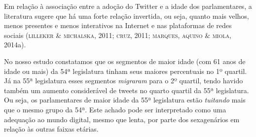 Em relação à associação entre a adoção do Twitter e a idade dos
parlamentares, a literatura sugere que há uma forte relação invertida,
ou seja, quanto mais velhos, menos presentes e menos interativos na
Internet e nas plataformas de redes sociais (\textsc{lilleker \& michalska},
2011; \textsc{cruz}, 2011; \textsc{marques, aquino \& miola}, 2014a).

No nosso estudo constatamos que os segmentos de maior idade (com 61 anos
de idade ou mais) da 54ª legislatura tinham seus maiores percentuais no
1º quartil. Já na 55ª legislatura esses segmentos \textit{migraram} para o 2º
quartil, tendo havido também um aumento considerável de tweets no quarto
quartil da 55ª legislatura. Ou seja, os parlamentares de maior idade da
55ª legislatura estão \emph{tuitando} mais que o mesmo grupo da 54ª.
Este achado pode ser interpretado como uma adequação ao mundo digital,
mesmo que lenta, por parte dos sexagenários em relação às outras faixas
etárias.

